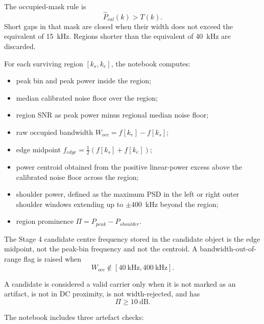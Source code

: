 \documentclass[11pt]{article}
\begin{document}
The occupied-mask rule is
\begin{equation}
\hat{P}_{cal}(k) > T(k).
\end{equation}
Short gaps in that mask are closed when their width does not exceed the equivalent of 15~kHz. Regions shorter than the equivalent of 40~kHz are discarded.

For each surviving region $[k_s, k_e]$, the notebook computes:
\begin{itemize}
    \item peak bin and peak power inside the region;
    \item median calibrated noise floor over the region;
    \item region SNR as peak power minus regional median noise floor;
    \item raw occupied bandwidth $W_{occ} = f[k_e] - f[k_s]$;
    \item edge midpoint $f_{edge} = \frac{1}{2}\left(f[k_s] + f[k_e]\right)$;
    \item power centroid obtained from the positive linear-power excess above the calibrated noise floor across the region;
    \item shoulder power, defined as the maximum PSD in the left or right outer shoulder windows extending up to $\pm 400$~kHz beyond the region;
    \item region prominence $\Pi = P_{peak} - P_{shoulder}$.
\end{itemize}

The Stage 4 candidate centre frequency stored in the candidate object is the edge midpoint, not the peak-bin frequency and not the centroid. A bandwidth-out-of-range flag is raised when
\begin{equation}
W_{occ} \notin [40~\text{kHz}, 400~\text{kHz}].
\end{equation}

A candidate is considered a valid carrier only when it is not marked as an artifact, is not in DC proximity, is not width-rejected, and has
\begin{equation}
\Pi \geq 10~\text{dB}.
\end{equation}

The notebook includes three artefact checks:
\end{document}
